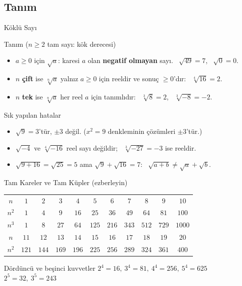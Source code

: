 \documentclass[aspectratio=169,11pt,handout]{beamer}
\begin{document}
\subsection{Tanım}
\begin{frame}{Köklü Sayı}
\begin{block}{Tanım (\(n\ge 2\) tam sayı: kök derecesi)}
\begin{itemize}
\item \(a\ge 0\) için \(\sqrt{a}\): karesi \(a\) olan \textbf{negatif olmayan} sayı. \ \(\sqrt{49}=7\), \ \(\sqrt{0}=0\).
\item \(n\) \textbf{çift} ise \(\sqrt[n]{a}\) yalnız \(a\ge 0\) için reeldir ve sonuç \(\ge 0\)'dır: \ \(\sqrt[4]{16}=2\).
\item \(n\) \textbf{tek} ise \(\sqrt[n]{a}\) her reel \(a\) için tanımlıdır: \ \(\sqrt[3]{8}=2\), \ \(\sqrt[3]{-8}=-2\).
\end{itemize}
\end{block}
\begin{alertblock}{Sık yapılan hatalar}
\begin{itemize}
\item \(\sqrt{9}=3\)'tür, \(\pm 3\) değil. (\(x^2=9\) denkleminin çözümleri \(\pm 3\)'tür.)
\item \(\sqrt{-4}\) ve \(\sqrt[4]{-16}\) reel sayı değildir; \ \(\sqrt[3]{-27}=-3\) ise reeldir.
\item \(\sqrt{9+16}=\sqrt{25}=5\) ama \(\sqrt{9}+\sqrt{16}=7\): \ \(\sqrt{a+b}\neq\sqrt{a}+\sqrt{b}\).
\end{itemize}
\end{alertblock}
\end{frame}

\begin{frame}{Tam Kareler ve Tam Küpler (ezberleyin)}
\begin{center}
\renewcommand{\arraystretch}{1.25}
\begin{tabular}{c|cccccccccc}
\toprule
\(n\) & \(1\) & \(2\) & \(3\) & \(4\) & \(5\) & \(6\) & \(7\) & \(8\) & \(9\) & \(10\)\\
\(n^2\) & \(1\) & \(4\) & \(9\) & \(16\) & \(25\) & \(36\) & \(49\) & \(64\) & \(81\) & \(100\)\\
\(n^3\) & \(1\) & \(8\) & \(27\) & \(64\) & \(125\) & \(216\) & \(343\) & \(512\) & \(729\) & \(1000\)\\\midrule
\(n\) & \(11\) & \(12\) & \(13\) & \(14\) & \(15\) & \(16\) & \(17\) & \(18\) & \(19\) & \(20\)\\
\(n^2\) & \(121\) & \(144\) & \(169\) & \(196\) & \(225\) & \(256\) & \(289\) & \(324\) & \(361\) & \(400\)\\\bottomrule
\end{tabular}
\end{center}
\begin{block}{Dördüncü ve beşinci kuvvetler}
\(2^4=16,\ 3^4=81,\ 4^4=256,\ 5^4=625\) \qquad \(2^5=32,\ 3^5=243\)
\end{block}
\end{frame}
\end{document}
